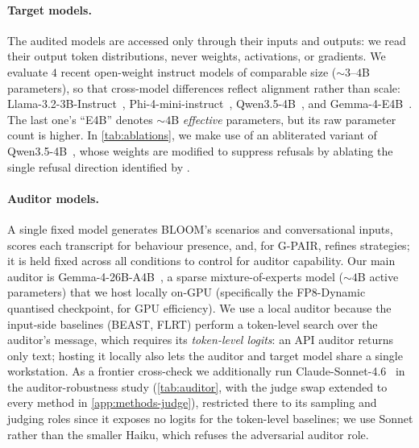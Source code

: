 \documentclass{article}
\theoremstyle{plain}
\theoremstyle{definition}
\theoremstyle{remark}
\begin{document}
\paragraph{Target models.}
The audited models are accessed only through their inputs and outputs: we read their output token distributions, never weights, activations, or gradients. We evaluate $4$ recent open-weight instruct models of comparable size (${\sim}3$--$4$B parameters), so that cross-model differences reflect alignment rather than scale: Llama-3.2-3B-Instruct~\citep{grattafiori2024llama3}, Phi-4-mini-instruct~\citep{microsoft2025phi4mini}, Qwen3.5-4B~\citep{qwen2026qwen35}, and Gemma-4-E4B~\citep{gemma2026gemma4}. The last one's ``E4B'' denotes ${\sim}4$B \emph{effective} parameters, but its raw parameter count is higher. In \cref{tab:ablations}, we make use of an abliterated variant of Qwen3.5-4B~\citep{huihui2026qwenabliterated}, whose weights are modified to suppress refusals by ablating the single refusal direction identified by \citet{arditi2024refusal}.


\paragraph{Auditor models.}
A single fixed model generates BLOOM's scenarios and conversational inputs, scores each transcript for behaviour presence, and, for G-PAIR, refines strategies; it is held fixed across all conditions to control for auditor capability. Our main auditor is Gemma-4-26B-A4B~\citep{gemma2026gemma4}, a sparse mixture-of-experts model (${\sim}4$B active parameters) that we host locally on-GPU (specifically the FP8-Dynamic quantised checkpoint, for GPU efficiency). We use a local auditor because the input-side baselines (BEAST, FLRT) perform a token-level search over the auditor's message, which requires its \emph{token-level logits}: an API auditor returns only text; hosting it locally also lets the auditor and target model share a single workstation. As a frontier cross-check we additionally run Claude-Sonnet-4.6~\citep{anthropic2026claude} in the auditor-robustness study (\cref{tab:auditor}, with the judge swap extended to every method in \cref{app:methods-judge}), restricted there to its sampling and judging roles since it exposes no logits for the token-level baselines; we use Sonnet rather than the smaller Haiku, which refuses the adversarial auditor role.
\end{document}
